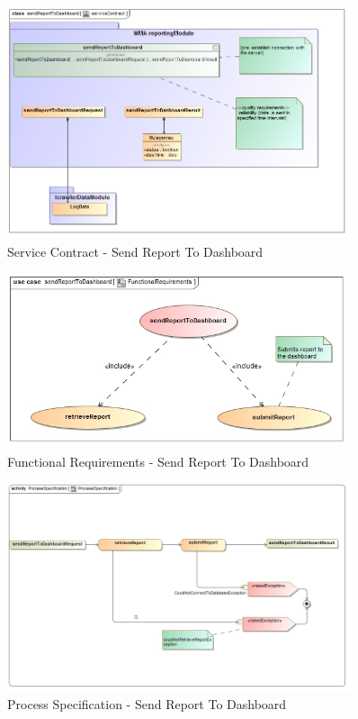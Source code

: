 \documentclass[hidelinks, 12pt, oneside]{article}
\begin{document}
		
		\begin{figure}[!htbp]
    		\centering
    		\includegraphics[width=0.9\textwidth]{img/serviceContractSendReportToDashboard.jpg}
    		\caption{Service Contract - Send Report To Dashboard}
    		\label{fig:ServiceCon_submitReport}
		\end{figure}
		\newpage	
			
		\begin{figure}[!htbp]
    		\centering
    		\includegraphics[width=0.9\textwidth]{img/functionalRequirementsSendReportToDashboard.jpg}
    		\caption{Functional Requirements - Send Report To Dashboard}
    		\label{fig:FunctionalReq_submitReport}
		\end{figure}
		
		
		\begin{figure}[!htbp]
    		\centering
    		\includegraphics[width=0.9\textwidth]{img/ProcessSpecificationSendResportToDashboard.jpg}
    		\caption{Process Specification - Send Report To Dashboard}
    		\label{fig:ProcessSpec_submitReport}
		\end{figure}	
\end{document}
